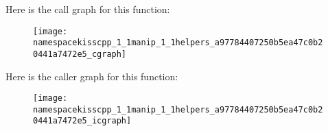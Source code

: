 Here is the call graph for this function\-:\nopagebreak
\begin{figure}[H]
\begin{center}
\leavevmode
\texttt{[image: namespacekisscpp\_1\_1manip\_1\_1helpers\_a97784407250b5ea47c0b20441a7472e5\_cgraph]}
\end{center}
\end{figure}




Here is the caller graph for this function\-:\nopagebreak
\begin{figure}[H]
\begin{center}
\leavevmode
\texttt{[image: namespacekisscpp\_1\_1manip\_1\_1helpers\_a97784407250b5ea47c0b20441a7472e5\_icgraph]}
\end{center}
\end{figure}


